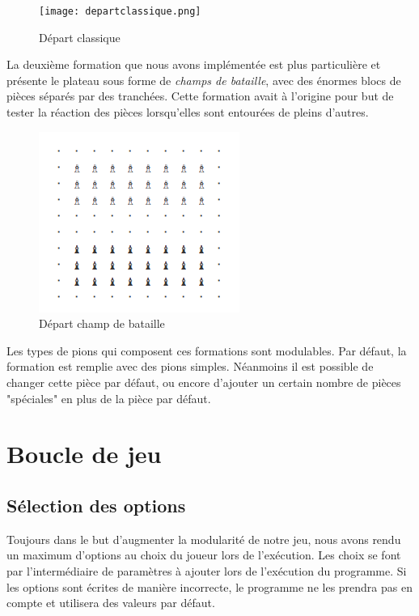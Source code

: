             \begin{figure}[H]
                \centering
                \texttt{[image: departclassique.png]}
                \caption{Départ classique}
                \label{fig:depart_classique}
            \end{figure}

            La deuxième formation que nous avons implémentée est plus particulière et présente le plateau sous forme de \textit{champs de bataille}, avec des énormes blocs de pièces séparés par des tranchées. Cette formation avait à l'origine pour but de tester la réaction des pièces lorsqu'elles sont entourées de pleins d'autres.
            \medbreak
            
            \begin{figure}[H]
                \centering
                \includegraphics[scale=0.6]{img/battleground.png}
                \caption{Départ champ de bataille}
                \label{fig:depart_champ_de_bataille}
            \end{figure}

            Les types de pions qui composent ces formations sont modulables. Par défaut, la formation est remplie avec des pions simples. Néanmoins il est possible de changer cette pièce par défaut, ou encore d'ajouter un certain nombre de pièces "spéciales" en plus de la pièce par défaut. 
            
    \section{Boucle de jeu}

        \subsection{Sélection des options}
            Toujours dans le but d'augmenter la modularité de notre jeu, nous avons rendu un maximum d'options au choix du joueur lors de l'exécution. Les choix se font par l'intermédiaire de paramètres à ajouter lors de l'exécution du programme. Si les options sont écrites de manière incorrecte, le programme ne les prendra pas en compte et utilisera des valeurs par défaut.
            
